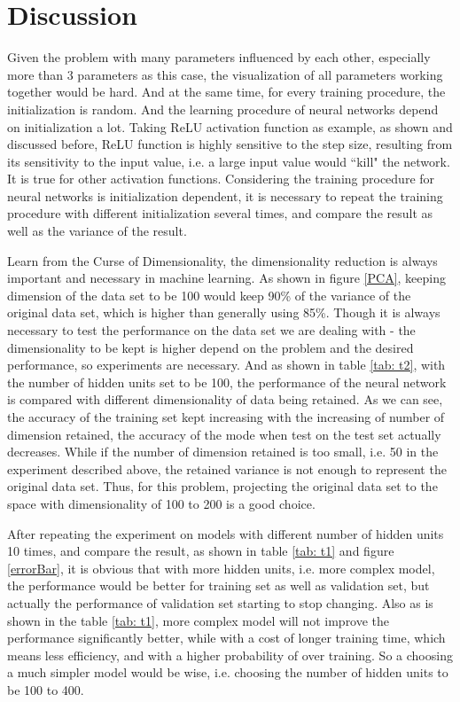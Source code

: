 \documentclass[conference]{IEEEtran}
\begin{document}
\section{Discussion}
Given the problem with many parameters influenced by each other, especially more than 3 parameters as this case, the visualization of all parameters working together would be hard. And at the same time, for every training procedure, the initialization is random. And the learning procedure of neural networks depend on initialization a lot. Taking ReLU activation function as example, as shown and discussed before, ReLU function is highly sensitive to the step size, resulting from its sensitivity to the input value, i.e. a large input value would ``kill" the network. It is true for other activation functions. Considering the training procedure for neural networks is initialization dependent, it is necessary to repeat the training procedure with different initialization several times, and compare the result as well as the variance of the result.

Learn from the Curse of Dimensionality, the dimensionality reduction is always important and necessary in machine learning. As shown in figure \ref{PCA}, keeping dimension of the data set to be 100 would keep 90\% of the variance of the original data set, which is higher than generally using 85\%. Though it is always necessary to test the performance on the data set we are dealing with - the dimensionality to be kept is higher depend on the problem and the desired performance, so experiments are necessary. And as shown in table \ref{tab: t2}, with the number of hidden units set to be 100, the performance of the neural network is compared with different dimensionality of data being retained. As we can see, the accuracy of the training set kept increasing with the increasing of number of dimension retained, the accuracy of the mode when test on the test set actually decreases. While if the number of dimension retained is too small, i.e. 50 in the experiment described above, the retained variance is not enough to represent the original data set. Thus, for this problem, projecting the original data set to the space with dimensionality of 100 to 200 is a good choice.

After repeating the experiment on models with different number of hidden units 10 times, and compare the result, as shown in table \ref{tab: t1} and figure \ref{errorBar}, it is obvious that with more hidden units, i.e. more complex model, the performance would be better for training set as well as validation set, but actually the performance of validation set starting to stop changing. Also as is shown in the table \ref{tab: t1}, more complex model will not improve the performance significantly better, while with a cost of longer training time, which means less efficiency, and with a higher probability of over training. So a choosing a much simpler model would be wise, i.e. choosing the number of hidden units to be 100 to 400. 
\end{document}
